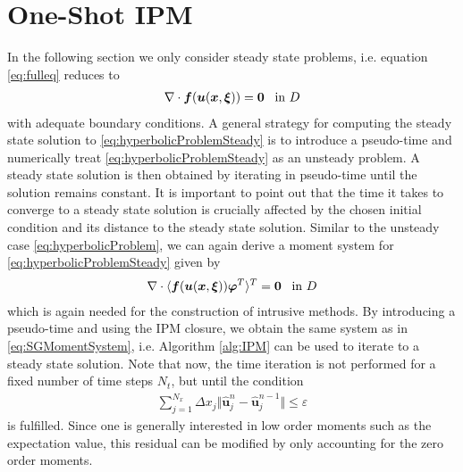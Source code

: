 \section{One-Shot IPM}
\label{sec:OneShotIPM}

In the following section we only consider steady state problems, i.e. equation \ref{eq:fulleq} reduces to
\begin{align}\label{eq:hyperbolicProblemSteady}
\nabla\cdot\bm{f}(\bm{u}(\bm{x},\bm{\xi})) = \bm{0} \enskip \text{ in } D
\end{align}
with adequate boundary conditions. A general strategy for computing the steady state solution to \eqref{eq:hyperbolicProblemSteady} is to introduce a pseudo-time and numerically treat \eqref{eq:hyperbolicProblemSteady} as an unsteady problem. A steady state solution is then obtained by iterating in pseudo-time until the solution remains constant. It is important to point out that the time it takes to converge to a steady state solution is crucially affected by the chosen initial condition and its distance to the steady state solution.
Similar to the unsteady case \eqref{eq:hyperbolicProblem}, we can again derive a moment system for \eqref{eq:hyperbolicProblemSteady} given by
\begin{align}\label{eq:MomentSystemSteady}
\nabla\cdot\langle\bm{f}(\bm{u}(\bm{x},\bm{\xi}))\bm{\varphi}^T\rangle^T = \bm{0} \enskip \text{ in } D
\end{align}
which is again needed for the construction of intrusive methods. By introducing a pseudo-time and using the IPM closure, we obtain the same system as in \eqref{eq:SGMomentSystem}, i.e. Algorithm \ref{alg:IPM} can be used to iterate to a steady state solution. Note that now, the time iteration is not performed for a fixed number of time steps $N_t$, but until the condition
\begin{align}\label{eq:residualSteady}
\sum_{j = 1}^{N_x} \Delta x_j \Vert \bm{\hat{u}}_j^n - \bm{\hat{u}}_j^{n-1} \Vert \leq \varepsilon
\end{align}
is fulfilled. Since one is generally interested in low order moments such as the expectation value, this residual can be modified by only accounting for the zero order moments.

